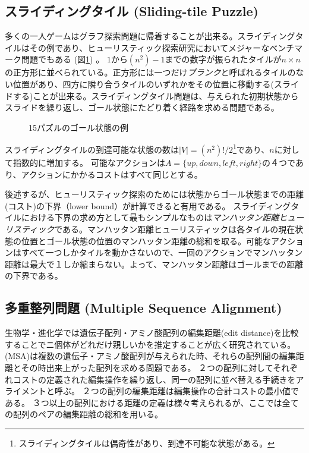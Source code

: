 \subsection{スライディングタイル (Sliding-tile Puzzle)}

多くの一人ゲームはグラフ探索問題に帰着することが出来る。スライディングタイルはその例であり、ヒューリスティック探索研究においてメジャーなベンチマーク問題でもある (図\ref{fig:15-puzzle}) \cite{johnson1879notes}。
$1$から$(n^2)-1$までの数字が振られたタイルが$n\times n$の正方形に並べられている。正方形には一つだけ{\it ブランク}と呼ばれるタイルのない位置があり、四方に隣り合うタイルのいずれかをその位置に移動する(スライドする)ことが出来る。スライディングタイル問題は、与えられた初期状態からスライドを繰り返し、ゴール状態にたどり着く経路を求める問題である。

\begin{figure}
\centering
\begin{tikzpicture}[scale=0.8]
  
\end{tikzpicture}
\caption{15パズルのゴール状態の例}
\label{fig:15-puzzle}
\end{figure}


スライディングタイルの到達可能な状態の数は$|V| = (n^2)!/2$\footnote{スライディングタイルは偶奇性があり、到達不可能な状態がある\cite{johnson1879notes}。}であり、$n$に対して指数的に増加する。
可能なアクションは$A= \{up, down, left, right\}$の４つであり、アクションにかかるコストはすべて同じとする。

後述するが、ヒューリスティック探索のためには状態からゴール状態までの距離(コスト)の下界（lower bound）が計算できると有用である。
スライディングタイルにおける下界の求め方として最もシンプルなものは{\it マンハッタン距離ヒューリスティック}である。マンハッタン距離ヒューリスティックは各タイルの現在状態の位置とゴール状態の位置のマンハッタン距離の総和を取る。可能なアクションはすべて一つしかタイルを動かさないので、一回のアクションでマンハッタン距離は最大で１しか縮まらない。よって、マンハッタン距離はゴールまでの距離の下界である。


\subsection{多重整列問題 (Multiple Sequence Alignment)}
\label{sec:msa}
生物学・進化学では遺伝子配列・アミノ酸配列の編集距離(edit distance)を比較することでニ個体がどれだけ親しいかを推定することが広く研究されている。
 (MSA)は複数の遺伝子・アミノ酸配列が与えられた時、それらの配列間の編集距離とその時出来上がった配列を求める問題である。
２つの配列に対してそれぞれコストの定義された編集操作を繰り返し、同一の配列に並べ替える手続きをアライメントと呼ぶ。
２つの配列の編集距離は編集操作の合計コストの最小値である。
３つ以上の配列における距離の定義は様々考えられるが、ここでは全ての配列のペアの編集距離の総和を用いる。

